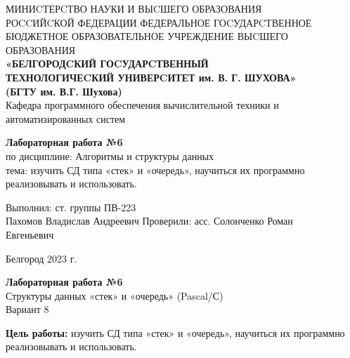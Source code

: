 \documentclass[a4paper,14pt]{extarticle}
\newcommand\textbox[1]{
	\parbox{.45\textwidth}{#1}
}
\begin{document}
\begin{center}
    \small{
        МИНИCТЕРCТВО НАУКИ И ВЫCШЕГО ОБРАЗОВАНИЯ \\РОCCИЙCКОЙ ФЕДЕРАЦИИ
        \bigbreak
        ФЕДЕРАЛЬНОЕ ГОCУДАРCТВЕННОЕ БЮДЖЕТНОЕ ОБРАЗОВАТЕЛЬНОЕ УЧРЕЖДЕНИЕ ВЫCШЕГО ОБРАЗОВАНИЯ \\
        \bigbreak
        \textbf{«БЕЛГОРОДCКИЙ ГОCУДАРCТВЕННЫЙ \\ТЕХНОЛОГИЧЕCКИЙ УНИВЕРCИТЕТ им. В. Г. ШУХОВА»\\ (БГТУ им. В.Г. Шухова)} \\
        \bigbreak
        Кафедра программного обеспечения вычислительной техники и автоматизированных систем\\}
\end{center}

\vfill
\begin{center}
    \large{
        \textbf{
            Лабораторная работа №6}}\\
    \normalsize{
        по дисциплине: Алгоритмы и структуры данных \\
        тема: изучить СД типа «стек» и «очередь», научиться их программно
        реализовывать и использовать.}
\end{center}
\vfill
\hfill\textbox{
    Выполнил: ст. группы ПВ-223\\Пахомов Владислав Андреевич
    \bigbreak
    Проверили: асс. Солонченко Роман\\Евгеньевич
}
\vfill\begin{center}
    Белгород 2023 г.
\end{center}
\newpage
\begin{center}
    \textbf{Лабораторная работа №6}\\
    Структуры данных «стек» и «очередь» (Pascal/С)\\
    Вариант 8
\end{center}
\textbf{Цель работы: }изучить СД типа «стек» и «очередь», научиться их
программно реализовывать и использовать.
\end{document}
